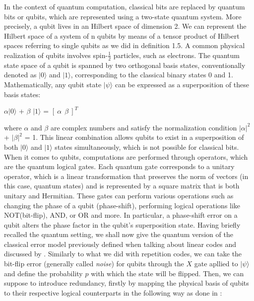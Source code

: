 \documentclass{Configuration_Files/PoliMi3i_thesis}
\begin{document}
In the context of quantum computation, classical bits are replaced by quantum bits or qubits, which are represented using a two-state quantum system. More precisely, a qubit lives in an Hilbert space of dimension 2. We can represent the Hilbert space of a system of n qubits by means of a tensor product of Hilbert spaces referring to single qubits as we did in definition 1.5. A common physical realization of qubits involves spin-$\frac{1}{2}$ particles, such as electrons. The quantum state space of a qubit is spanned by two orthogonal basis states, conventionally denoted as $ |0 \rangle$ and $ |1 \rangle$, corresponding to the classical binary states 0 and 1. Mathematically, any qubit state 
$ |\psi \rangle$ can be expressed as a superposition of these basis states:


\begin{center}
	$\alpha |0 \rangle$ + $\beta$ $|1 \rangle$ =  $[ \ \alpha \ \ \beta \ ]^T $
\end{center}

where $\alpha$ and $\beta$ are complex numbers and satisfy the normalization condition $|\alpha|^2$ + $|\beta|^2$ = 1. This linear combination allows qubits to exist in a superposition of both $|0 \rangle$ and $ |1 \rangle$  states simultaneously, which is not possible for classical bits.  \newline
When it comes to qubits, computations are performed through operators, which are the quantum logical gates. Each quantum gate corresponds to a unitary operator, which is a linear transformation that preserves the norm of vectors (in this case, quantum states) and is represented by a square matrix that is both unitary and Hermitian. These gates can perform various operations such as changing the phase of a qubit (phase-shift), performing logical operations like NOT(bit-flip), AND, or OR and more.\newline
In particular, a phase-shift error on a qubit alters the phase factor in the qubit's superposition state. \newline
Having briefly recalled the quantum setting, we shall now give the quantum version of the classical error model previously defined when talking about linear codes and discussed by \cite{Cha06}. \newline
Similarly to what we did with repetition codes, we can take the bit-flip error (generally called {\it noise}) for qubits through the $X$ gate apllied to $|\psi \rangle$ and define the probability $p$ with which the state will be flipped.\newline
Then, we can suppose to introduce redundancy, firstly by mapping the physical basis of qubits to their respective logical counterparts in the following way as done in \cite{Nie06}:
\end{document}
